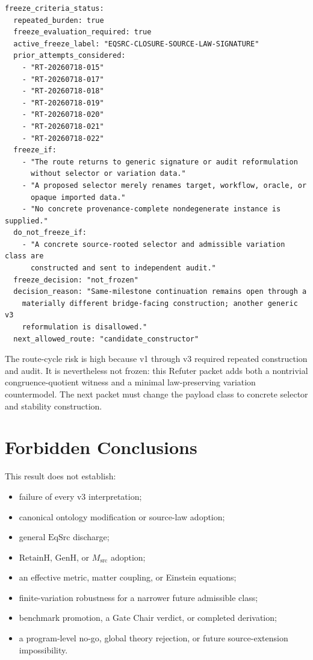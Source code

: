 \documentclass[11pt]{article}
\begin{document}
\begin{verbatim}
freeze_criteria_status:
  repeated_burden: true
  freeze_evaluation_required: true
  active_freeze_label: "EQSRC-CLOSURE-SOURCE-LAW-SIGNATURE"
  prior_attempts_considered:
    - "RT-20260718-015"
    - "RT-20260718-017"
    - "RT-20260718-018"
    - "RT-20260718-019"
    - "RT-20260718-020"
    - "RT-20260718-021"
    - "RT-20260718-022"
  freeze_if:
    - "The route returns to generic signature or audit reformulation
      without selector or variation data."
    - "A proposed selector merely renames target, workflow, oracle, or
      opaque imported data."
    - "No concrete provenance-complete nondegenerate instance is supplied."
  do_not_freeze_if:
    - "A concrete source-rooted selector and admissible variation class are
      constructed and sent to independent audit."
  freeze_decision: "not_frozen"
  decision_reason: "Same-milestone continuation remains open through a
    materially different bridge-facing construction; another generic v3
    reformulation is disallowed."
  next_allowed_route: "candidate_constructor"
\end{verbatim}

The route-cycle risk is high because v1 through v3 required repeated
construction and audit. It is nevertheless not frozen: this Refuter packet
adds both a nontrivial congruence-quotient witness and a minimal
law-preserving variation countermodel. The next packet must change the payload
class to concrete selector and stability construction.

\section{Forbidden Conclusions}

This result does not establish:
\begin{itemize}[leftmargin=*]
  \item failure of every v3 interpretation;
  \item canonical ontology modification or source-law adoption;
  \item general \(\mathrm{EqSrc}\) discharge;
  \item \(\mathrm{RetainH}\), \(\mathrm{GenH}\), or
  \(M_{\mathrm{src}}\) adoption;
  \item an effective metric, matter coupling, or Einstein equations;
  \item finite-variation robustness for a narrower future admissible class;
  \item benchmark promotion, a Gate Chair verdict, or completed derivation;
  \item a program-level no-go, global theory rejection, or future
  source-extension impossibility.
\end{itemize}
\end{document}
